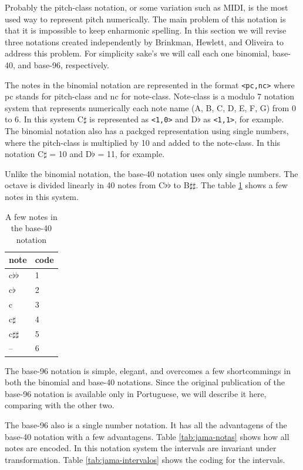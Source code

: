 \documentclass{article}
\begin{document}
Probably the pitch-class notation, or some variation such as MIDI, is
the most used way to represent pitch numerically. The main problem of
this notation is that it is impossible to keep enharmonic spelling. In
this section we will revise three notations created independently by
Brinkman, Hewlett, and Oliveira
\cite{brinkman86:_binom_repres_of_pitch_for,hewlett92:base40,oliveira01:codificacao}
to address this problem. For simplicity sake's we will call each one
binomial, base-40, and base-96, respectively.

The notes in the binomial notation are represented in the format
\texttt{<pc,nc>} where pc stands for pitch-class and nc for
note-class. Note-class is a modulo 7 notation system that represents
numerically each note name (A, B, C, D, E, F, G) from 0 to 6. In this
system C$\sharp$ is represented as \texttt{<1,0>} and D$\flat$ as
\texttt{<1,1>}, for example. The binomial notation also has a packged
representation using single numbers, where the pitch-class is
multiplied by 10 and added to the note-class. In this notation C$\sharp$
= 10 and D$\flat$ = 11, for example.

Unlike the binomial notation, the base-40 notation uses only single
numbers. The octave is divided linearly in 40 notes from C$\flat\flat$
to B$\sharp\sharp$. The table \ref{tab:base40} shows a few notes in
this system.

\begin{table}
  \centering
  \begin{tabular}{l|l}
    note & code \\
    \hline
    c$\flat\flat$ & 1 \\
    c$\flat$ & 2 \\
    c & 3 \\
    c$\sharp$ & 4 \\
    c$\sharp\sharp$ & 5 \\
    -- & 6 \\
  \end{tabular}
  \caption{A few notes in the base-40 notation}
  \label{tab:base40}
\end{table}

The base-96 notation is simple, elegant, and overcomes a few
shortcommings in both the binomial and base-40 notations. Since the
original publication of the base-96 notation is available only in
Portuguese, we will describe it here, comparing with the other
two.

The base-96 also is a single number notation. It has all the
advantagens of the base-40 notation with a few advantagens. Table
\ref{tab:jama-notas} shows how all notes are encoded. In this notation
system the intervals are invariant under transformation. Table
\ref{tab:jama-intervalos} shows the coding for the intervals.
\end{document}
